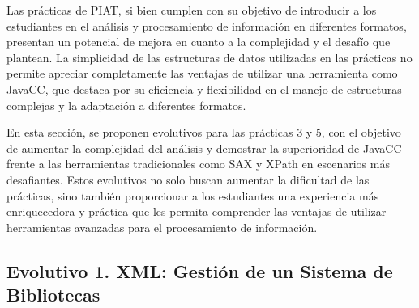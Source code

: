 


\noindent Las prácticas de PIAT, si bien cumplen con su objetivo de introducir a los estudiantes en el análisis y procesamiento de información en diferentes formatos, presentan un potencial de mejora en cuanto a la complejidad y el desafío que plantean. La simplicidad de las estructuras de datos utilizadas en las prácticas no permite apreciar completamente las ventajas de utilizar una herramienta como JavaCC, que destaca por su eficiencia y flexibilidad en el manejo de estructuras complejas y la adaptación a diferentes formatos.

En esta sección, se proponen evolutivos para las prácticas 3 y 5, con el objetivo de aumentar la complejidad del análisis y demostrar la superioridad de JavaCC frente a las herramientas tradicionales como SAX y XPath en escenarios más desafiantes. Estos evolutivos no solo buscan aumentar la dificultad de las prácticas, sino también proporcionar a los estudiantes una experiencia más enriquecedora y práctica que les permita comprender las ventajas de utilizar herramientas avanzadas para el procesamiento de información.

\subsection{Evolutivo 1. XML: Gestión de un Sistema de Bibliotecas}



